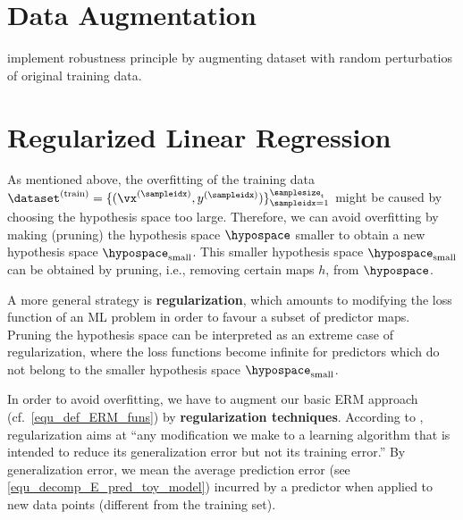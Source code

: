 \documentclass[12pt]{report}
\begin{document}
\section{Data Augmentation} 
\label{sec_data_augmentation} 
implement robustness principle by augmenting dataset with random perturbatios of original training data. 



\section{Regularized Linear Regression}
\label{sec_regularization}

As mentioned above, the overfitting of the training data 
$\dataset^{(\rm train)}=\{(\vx^{(\sampleidx)},y^{(\sampleidx)})\}_{\sampleidx=1}^{\samplesize_{\rm t}}$ 
might be caused by choosing the hypothesis space too large. Therefore, we can avoid 
overfitting by making (pruning) the hypothesis space $\hypospace$ smaller to obtain a new 
hypothesis space $\hypospace_{\rm small}$. This smaller hypothesis space $\hypospace_{\rm small}$ 
can be obtained by pruning, i.e., removing certain maps $h$, from $\hypospace$. 

A more general strategy is {\bf regularization}, which amounts to modifying the loss 
function of an ML problem in order to favour a subset of predictor maps. Pruning the 
hypothesis space can be interpreted as an extreme case of regularization, where the 
loss functions become infinite for predictors which do not belong to the smaller 
hypothesis space $\hypospace_{\rm small}$. 

%

In order to avoid overfitting, we have to augment our basic ERM approach 
(cf.\ \eqref{equ_def_ERM_funs}) by {\bf regularization techniques}. According 
to \cite{Goodfellow-et-al-2016}, regularization aims at ``any modification we 
make to a learning algorithm that is intended to reduce its generalization error 
but not its training error.'' By generalization error, we mean the average prediction 
error (see \eqref{equ_decomp_E_pred_toy_model}) incurred by a predictor 
when applied to new data points (different from the training set). 
\end{document}
